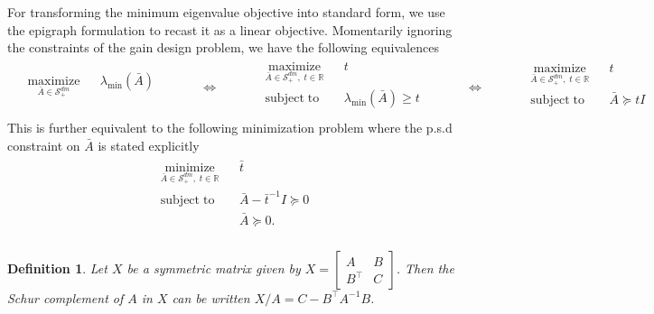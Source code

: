 \documentclass[a4paper]{article}
\newtheorem{defn}{Definition}
\begin{document}
For transforming the minimum eigenvalue objective into standard form, we use the epigraph formulation to recast it as a linear objective.
Momentarily ignoring the constraints of the gain design problem, we have the following equivalences
\begin{equation*}
\begin{split}
\begin{aligned}
& \underset{\bar{A}\in\mathcal{S}^{dm}_+}{\mathrm{maximize}}
& & \lambda_{\mathrm{min}} \left( \bar{A} \right) & \\
\end{aligned}
\end{split}
\qquad\iff\qquad
\begin{split}
\begin{aligned}
& \underset{\bar{A}\in\mathcal{S}^{dm}_+,\;t\in\mathbb{R}}{\mathrm{maximize}}
& & t & \\
& \mathrm{subject\; to}
& & \lambda_{\mathrm{min}} \left( \bar{A} \right) \geq t \\
\end{aligned}
\end{split}
\qquad\iff\qquad
\begin{split}
\begin{aligned}
& \underset{\bar{A}\in\mathcal{S}^{dm}_+,\;t\in\mathbb{R}}{\mathrm{maximize}}
& & t & \\
& \mathrm{subject\; to}
& & \bar{A} \succeq tI \\
\end{aligned}
\end{split}
\end{equation*}
This is further equivalent to the following minimization problem where the p.s.d constraint on $\bar{A}$ is stated explicitly
\begin{equation}\label{eq:epigraph-eig}
\begin{split}
\begin{aligned}
& \underset{\bar{A}\in\mathcal{S}^{dm}_+,\;t\in\mathbb{R}}{\mathrm{minimize}}
& & \bar{t} & \\
& \mathrm{subject\; to}
& & \bar{A} - \bar{t}^{-1}I \succeq 0 \\
&&& \bar{A} \succeq 0. \\
\end{aligned}
\end{split}
\end{equation}

\begin{defn}\label{defn:schur}
Let $X$ be a symmetric matrix given by $X=\begin{bmatrix}A&B\\B^\top&C\end{bmatrix}$.
Then the Schur complement of $A$ in $X$ can be written $X/A = C - B^\top A^{-1} B$.
\end{defn}
\end{document}
